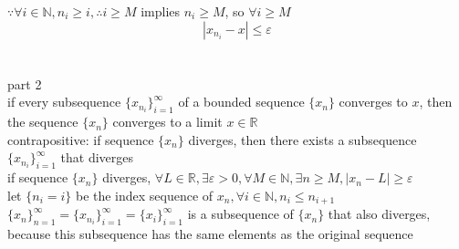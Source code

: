 \documentclass[12pt, border = 4pt, multi]{article} %
\begin{document}
$\because \forall i \in \mathbb{N}, n_i \geq i, \therefore i \geq M$ implies $n_i \geq M$, so $\forall i \geq M$
\[|x_{n_i} - x| \leq \varepsilon\]
\\
\\
part 2\\
if every subsequence $\{x_{n_i}\}_{i = 1} ^ {\infty}$ of a bounded sequence $\{x_n\}$ converges to $x$, then the sequence $\{x_n\}$ converges to a limit $x \in \mathbb{R}$\\
contrapositive: if sequence $\{x_n\}$ diverges, then there exists a subsequence $\{x_{n_i}\}_{i = 1} ^ {\infty}$ that diverges\\
if sequence $\{x_n\}$ diverges, $\forall L \in \mathbb{R}, \exists \varepsilon > 0, \forall M \in \mathbb{N}, \exists n \geq M, |x_n - L| \geq \varepsilon$\\
let $\{n_i = i\}$ be the index sequence of $x_n, \forall i \in \mathbb{N}, n_i \leq n_{i + 1}$\\
$\{x_n\}_{n = 1} ^ {\infty} = \{x_{n_i}\}_{i = 1} ^ {\infty} = \{x_i\}_{i = 1} ^ {\infty}$ is a subsequence of $\{x_n\}$ that also diverges, because this subsequence has the same elements as the original sequence
\end{document}
